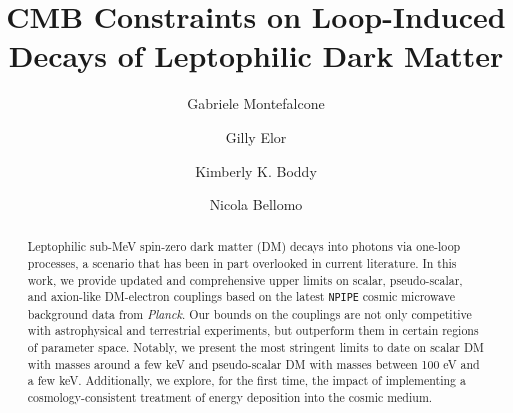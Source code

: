 \documentclass[aps,prd,twocolumn,showpacs,superscriptaddress,nofootinbib,preprintnumbers]{revtex4-2}
\begin{document}

\title{CMB Constraints on Loop-Induced Decays of Leptophilic Dark Matter}

\author{Gabriele Montefalcone}

\author{Gilly Elor}

\author{Kimberly K. Boddy}


\author{Nicola Bellomo}

\begin{abstract}

Leptophilic sub-MeV spin-zero dark matter (DM) decays into photons via one-loop processes, a scenario that has been in part overlooked in current literature.
In this work, we provide updated and comprehensive upper limits on scalar, pseudo-scalar, and axion-like DM-electron couplings based on the latest \texttt{NPIPE} cosmic microwave background data from \textit{Planck}. Our bounds on the couplings are not only competitive with astrophysical and terrestrial experiments, but outperform them in certain regions of parameter space.
Notably, we present the most stringent limits to date on scalar DM with masses around a few keV and pseudo-scalar DM with masses between 100 eV and a few keV.
Additionally, we explore, for the first time, the impact of implementing a cosmology-consistent treatment of energy deposition into the cosmic medium.
\end{abstract}

\maketitle
\end{document}
